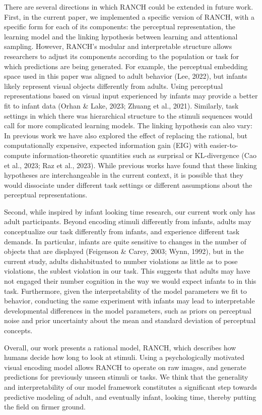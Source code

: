 \documentclass[10pt, letterpaper]{article}
\begin{document}
There are several directions in which RANCH could be extended in future
work. First, in the current paper, we implemented a specific version of
RANCH, with a specific form for each of its components: the perceptual
representation, the learning model and the linking hypothesis between
learning and attentional sampling. However, RANCH's modular and
interpretable structure allows researchers to adjust its components
according to the population or task for which predictions are being
generated. For example, the perceptual embedding space used in this
paper was aligned to adult behavior (Lee, 2022), but infants likely
represent visual objects differently from adults. Using perceptual
representations based on visual input experienced by infants may provide
a better fit to infant data (Orhan \& Lake, 2023; Zhuang et al., 2021).
Similarly, task settings in which there was hierarchical structure to
the stimuli sequences would call for more complicated learning models.
The linking hypothesis can also vary: In previous work we have also
explored the effect of replacing the rational, but computationally
expensive, expected information gain (EIG) with easier-to-compute
information-theoretic quantities such as surprisal or KL-divergence (Cao
et al., 2023; Raz et al., 2023). While previous works have found that
these linking hypotheses are interchangeable in the current context, it
is possible that they would dissociate under different task settings or
different assumptions about the perceptual representations.

Second, while inspired by infant looking time research, our current work
only has adult participants. Beyond encoding stimuli differently from
infants, adults may conceptualize our task differently from infants, and
experience different task demands. In particular, infants are quite
sensitive to changes in the number of objects that are displayed
(Feigenson \& Carey, 2003; Wynn, 1992), but in the current study, adults
dishabituated to number violations as little as to pose violations, the
sublest violation in our task. This suggests that adults may have not
engaged their number cognition in the way we would expect infants to in
this task. Furthermore, given the interpretability of the model
parameters we fit to behavior, conducting the same experiment with
infants may lead to interpretable developmental differences in the model
parameters, such as priors on perceptual noise and prior uncertainty
about the mean and standard deviation of perceptual concepts.

Overall, our work presents a rational model, RANCH, which describes how
humans decide how long to look at stimuli. Using a psychologically
motivated visual encoding model allows RANCH to operate on raw images,
and generate predictions for previously unseen stimuli or tasks. We
think that the generality and interpretability of our model framework
constitutes a significant step towards predictive modeling of adult, and
eventually infant, looking time, thereby putting the field on firmer
ground.
\end{document}
